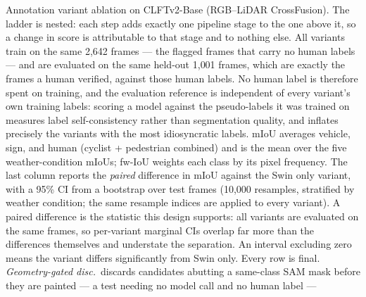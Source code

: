 \begin{table}[t]
\centering
\caption{Annotation variant ablation on CLFTv2-Base (RGB--LiDAR CrossFusion).
         The ladder is nested: each step adds exactly one pipeline stage to the one above it, so a
         change in score is attributable to that stage and to nothing else.
         All variants train on the same 2{,}642 frames --- the flagged frames that carry no human
         labels --- and are evaluated on the same held-out 1{,}001 frames, which are exactly the
         frames a human verified, against those human labels.
         No human label is therefore spent on training, and the evaluation reference is independent
         of every variant's own training labels: scoring a model against the pseudo-labels it was
         trained on measures label self-consistency rather than segmentation quality, and inflates
         precisely the variants with the most idiosyncratic labels.
         mIoU averages vehicle, sign, and human (cyclist + pedestrian combined) and is the mean over
         the five weather-condition mIoUs; fw-IoU weights each class by its pixel frequency.
         The last column reports the \emph{paired} difference in mIoU against the Swin only variant,
         with a 95\% CI from a bootstrap over test frames (10{,}000 resamples, stratified by weather
         condition; the same resample indices are applied to every variant).
         A paired difference is the statistic this design supports: all variants are evaluated on the
         same frames, so per-variant marginal CIs overlap far more than the differences themselves and
         understate the separation.
         An interval excluding zero means the variant differs significantly from Swin only.
         Every row is final. \emph{Geometry-gated disc.}\ discards candidates abutting a same-class
         SAM mask before they are painted --- a test needing no model call and no human label ---
}
\end{table}
